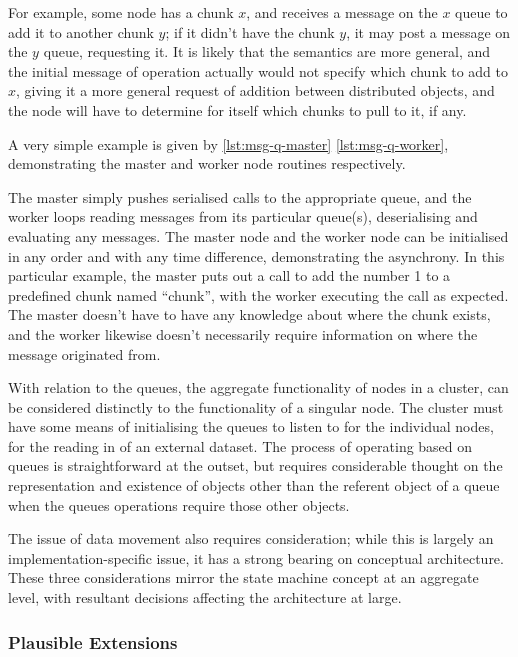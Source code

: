 For example, some node has a chunk \(x\), and receives a message on the \(x\) queue to add it to another chunk \(y\); if it didn't have the chunk \(y\), it may post a message on the \(y\) queue, requesting it.
It is likely that the semantics are more general, and the initial message of operation actually would not specify which chunk to add to \(x\), giving it a more general request of addition between distributed objects, and the node will have to determine for itself which chunks to pull to it, if any.

A very simple example is given by \cref{lst:msg-q-master} \cref{lst:msg-q-worker}, demonstrating the master and worker node routines respectively.



The master simply pushes serialised calls to the appropriate queue, and the worker loops reading messages from its particular queue(s), deserialising and evaluating any messages.
The master node and the worker node can be initialised in any order and with any time difference, demonstrating the asynchrony.
In this particular example, the master puts out a call to add the number 1 to a predefined chunk named ``chunk'', with the worker executing the call as expected.
The master doesn't have to have any knowledge about where the chunk exists, and the worker likewise doesn't necessarily require information on where the message originated from.

With relation to the queues, the aggregate functionality of nodes in a cluster, can be considered distinctly to the functionality of a singular node.
The cluster must have some means of initialising the queues to listen to for the individual nodes, for the reading in of an external dataset.
The process of operating based on queues is straightforward at the outset, but requires considerable thought on the representation and existence of objects other than the referent object of a queue when the queues operations require those other objects.

The issue of data movement also requires consideration; while this is largely an implementation-specific issue, it has a strong bearing on conceptual architecture.
These three considerations mirror the state machine concept at an aggregate level, with resultant decisions affecting the architecture at large.

\subsubsection{Plausible Extensions}\label{plausible-extensions}

